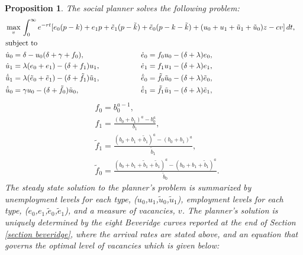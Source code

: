 \documentclass[12pt]{article} %
\newtheorem{proposition}{Proposition}
\theoremstyle{definition}
\begin{document}
\begin{proposition}\label{prop SSPP}
\indent The social planner solves the following problem: 
\begin{align*}
   &\max_{v}
   \begin{aligned}[t]
      &\int_{0}^{\infty} e^{-rt}[e_0(p-k) + e_1p + \tilde{e}_1(p-\tilde{k}) + \tilde{e}_0(p-k-\tilde{k}) +(u_0 + u_1 + \tilde{u}_1 + \tilde{u}_0)z -cv ] \,dt, 
   \end{aligned}  \notag \\
   &\text{subject to} \notag \\
   &\begin{aligned}
   \begin{split}
   & \dot{u}_0 =\delta - u_0(\delta + \gamma + f_0), \\
   & \dot{u}_1 = \lambda(e_0 + e_1) - (\delta + f_1)u_1, \\
   & \dot{\tilde{u}}_1=\lambda( \tilde{e}_0 + \tilde{e}_1) - (\delta + \tilde{f}_1)\tilde{u}_1, \\
   &\dot{\tilde{u}}_0 = \gamma u_0 - (\delta + \tilde{f}_0)\tilde{u}_0, 
   \end{split}
   \hspace{2cm}
   \begin{split}
   &\dot{e}_0 = f_0u_0 - (\delta + \lambda)e_0, \\
   &\dot{e}_1 = f_1u_1 - (\delta + \lambda)e_1, \\
   &\dot{\tilde{e}}_0=\tilde{f}_0\tilde{u}_0 - (\delta + \lambda)\tilde{e}_0, \\
   &\dot{\tilde{e}}_1=\tilde{f}_1\tilde{u}_1 - (\delta + \lambda)\tilde{e}_1, 
   \end{split}
   \end{aligned}
   \end{align*}
      \begin{align*}
   &f_0=b_0^{a-1}, \\
   &f_1=\frac{(b_0 + b_1)^a - b_0^a}{b_1}, \\
   &\tilde{f}_1=\frac{(b_0 + b_1 +\tilde{b}_1)^a - (b_0+b_1)^a}{\tilde{b}_1}, \\
   &\tilde{f}_0=\frac{(b_0 + b_1 + \tilde{b}_1 + \tilde{b}_1)^a - (b_0 + b_1 + \tilde{b}_1)^a}{\tilde{b}_0}.
\end{align*} The steady state solution to the planner's problem is summarized by unemployment levels for each type, ($u_0$,$u_1$,$\tilde{u}_0$,$\tilde{u}_1$), employment levels for each type, ($e_0$,$e_1$,$\tilde{e}_0$,$\tilde{e}_1$), and a measure of vacancies, $v$. The planner's solution is uniquely determined by the eight Beveridge curves reported at the end of Section \ref{section beveridge}, where the arrival rates are stated above, and an equation that governs the optimal level of vacancies which is given below: 

\end{proposition}
\end{document}
